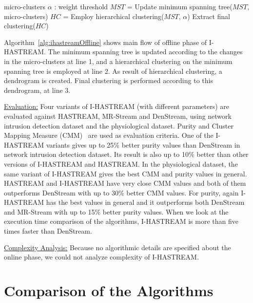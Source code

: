 \documentclass[smallcondensed]{svjour3}     %
\begin{document}
\begin{algorithm}
	\caption{I-HASTREAM offline phase (micro-clusters, $\alpha$)}
	\label{alg:ihastreamOffline}
	\begin{algorithmic}[1]
		\Require micro-clusters
		\Require $\alpha$ : weight threshold
		\State $MST$ = Update minimum spanning tree($MST$, micro-clusters)
		\State $HC$ = Employ hierarchical clustering($MST$, $\alpha$)
		\State Extract final clustering($HC$)
	\end{algorithmic}
\end{algorithm}

Algorithm~\ref{alg:ihastreamOffline} shows main flow of offline phase of I-HASTREAM. The minimum spanning tree is updated according to the changes in the micro-clusters at line 1, and a hierarchical clustering on the minimum spanning tree is employed at line 2. As result of hierarchical clustering, a dendrogram is created. Final clustering is performed according to this dendrogram, at line 3. 

\underline{Evaluation:} Four variants of I-HASTREAM (with different parameters) are evaluated against HASTREAM, MR-Stream and DenStream, using network intrusion detection dataset and the physiological dataset. Purity and Cluster Mapping Measure (CMM)~\citep{Kremer:2011:CMM} are used as evaluation criteria. One of the I-HASTREAM variants gives up to 25\% better purity values than DenStream in network intrusion detection dataset. Its result is also up to 10\% better than other versions of I-HASTREAM and HASTREAM. In the physiological dataset, the same variant of I-HASTREAM gives the best CMM and purity values in general. HASTREAM and I-HASTREAM have very close CMM values and both of them outperforms DenStream with up to 30\% better CMM values. For purity, again I-HASTREAM has the best values in general and it outperforms both DenStream and MR-Stream with up to 15\% better purity values. When we look at the execution time comparison of the algorithms, I-HASTREAM is more than five times faster than DenStream.

\underline{Complexity Analysis:} Because no algorithmic details are specified about the online phase, we could not analyze complexity of I-HASTREAM.


%
\section{Comparison of the Algorithms}
\label{sec:methodComparison}
\end{document}
